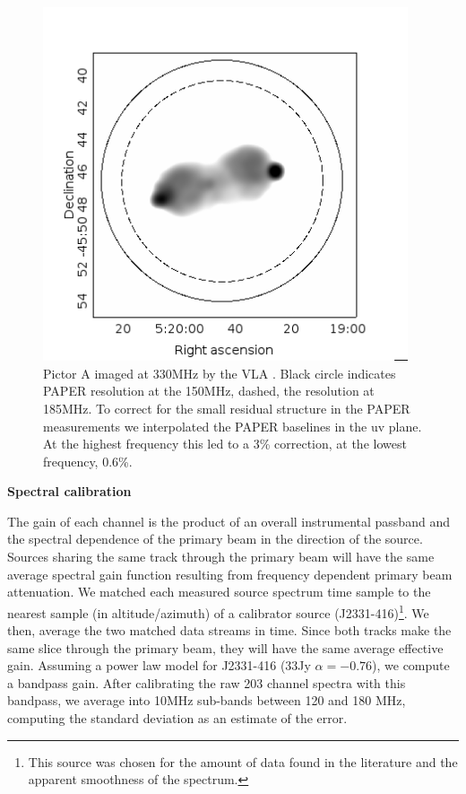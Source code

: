 \documentclass[preprint]{aastex}
\begin{document}
\begin{figure}
\includegraphics[width=0.96\textwidth]{plots/picA_Perley.png}
\caption{
Pictor A imaged at 330MHz by the VLA \citep{Perley:1997p9312}. Black circle
indicates PAPER resolution at the 150MHz, dashed, the resolution at 185MHz.  To
correct for the small residual structure in the PAPER measurements we
interpolated the PAPER baselines in the uv plane. At the highest frequency this
led to a 3\% correction, at the lowest frequency, 0.6\%.
\label{fig:pic_perley}}
\end{figure}

\textbf{Spectral calibration}\\
\label{sec:Calibration}

The gain of each channel is the product of an overall instrumental passband and
the spectral dependence of the primary beam in the direction of the source.
Sources sharing the same track through the primary beam will have the same
average spectral gain function resulting from frequency dependent primary beam
attenuation.   We matched each measured source spectrum time sample to the
nearest sample (in altitude/azimuth) of a calibrator source
(J2331-416)\footnote{This source was chosen for the amount of data found in the
literature and the apparent smoothness of the spectrum.}.  We then, average the
two matched data streams in time.  Since both tracks make the same slice
through the primary beam, they will have the same average effective gain.
Assuming a power law model for J2331-416 (33Jy $\alpha=-0.76$), we compute a
bandpass gain.  After calibrating the raw 203 channel spectra with this
bandpass, we average into 10MHz sub-bands between 120 and 180 MHz, computing
the standard deviation as an estimate of the error. 
\end{document}
